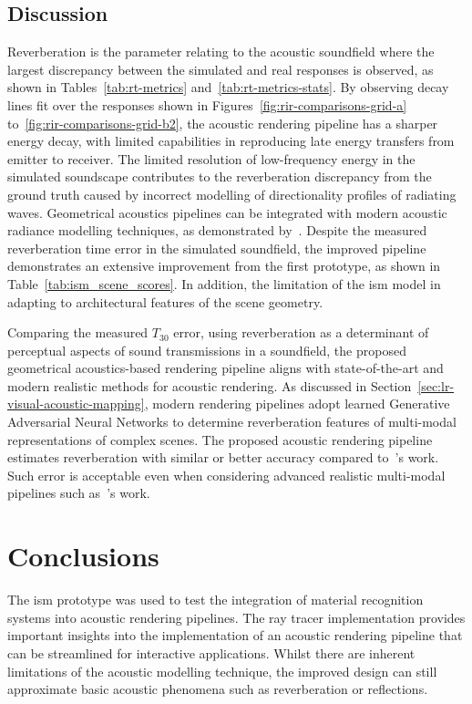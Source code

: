\subsection{Discussion}
Reverberation is the parameter relating to the acoustic soundfield where the largest discrepancy between the simulated and real responses is observed, as shown in Tables~\ref{tab:rt-metrics} and~\ref{tab:rt-metrics-stats}. By observing decay lines fit over the responses shown in Figures~\ref{fig:rir-comparisons-grid-a} to~\ref{fig:rir-comparisons-grid-b2}, the acoustic rendering pipeline has a sharper energy decay, with limited capabilities in reproducing late energy transfers from emitter to receiver. The limited resolution of low-frequency energy in the simulated soundscape contributes to the reverberation discrepancy from the ground truth caused by incorrect modelling of directionality profiles of radiating waves. Geometrical acoustics pipelines can be integrated with modern acoustic radiance modelling techniques, as demonstrated by~\cite{siltanen2010room}. Despite the measured reverberation time error in the simulated soundfield, the improved pipeline demonstrates an extensive improvement from the first prototype, as shown in Table~\ref{tab:ism_scene_scores}. In addition, the limitation of the \acrshort{ism} model in adapting to architectural features of the scene geometry. \par
Comparing the measured $T_{30}$ error, using reverberation as a determinant of perceptual aspects of sound transmissions in a soundfield, the proposed geometrical acoustics-based rendering pipeline aligns with state-of-the-art and modern realistic methods for acoustic rendering. As discussed in Section~\ref{sec:lr-visual-acoustic-mapping}, modern rendering pipelines adopt learned Generative Adversarial Neural Networks to determine reverberation features of multi-modal representations of complex scenes. The proposed acoustic rendering pipeline estimates reverberation with similar or better accuracy compared to~\cite{Singh_2021_ICCV}'s work. Such error is acceptable even when considering advanced realistic multi-modal pipelines such as~\cite{schissler2014high}'s work. \par


\section{Conclusions}
The \acrshort{ism} prototype was used to test the integration of material recognition systems into acoustic rendering pipelines. 
The ray tracer implementation provides important insights into the implementation of an acoustic rendering pipeline that can be streamlined for interactive applications. Whilst there are inherent limitations of the acoustic modelling technique, the improved design can still approximate basic acoustic phenomena such as reverberation or reflections.